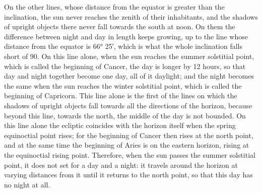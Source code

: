 \documentclass[11pt]{article}
\begin{document}
\par On the other lines, whose distance from the equator is greater than the inclination, the sun never reaches the zenith of their inhabitants, and the shadows of upright objects there never fall towards the south at noon. On them the difference between night and day in length keeps growing, up to the line whose distance from the equator is 66° 25′, which is what the whole inclination falls short of 90. On this line alone, when the sun reaches the summer solstitial point, which is called the beginning of Cancer, the day is longer by 12 hours, so that day and night together become one day, all of it daylight; and the night becomes the same when the sun reaches the winter solstitial point, which is called the beginning of Capricorn. This line alone is the first of the lines on which the shadows of upright objects fall towards all the directions of the horizon, because beyond this line, towards the north, the middle of the day is not bounded. On this line alone the ecliptic coincides with the horizon itself when the spring equinoctial point rises; for the beginning of Cancer then rises at the north point, and at the same time the beginning of Aries is on the eastern horizon, rising at the equinoctial rising point. Therefore, when the sun passes the summer solstitial point, it does not set for a day and a night: it travels around the horizon at varying distances from it until it returns to the north point, so that this day has no night at all.\par
\end{document}
